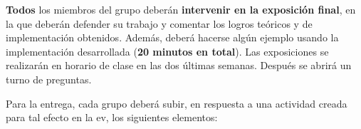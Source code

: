 \documentclass[a4paper]{article}
\begin{document}
\textbf{Todos} los miembros del grupo deberán \textbf{intervenir en la exposición final}, en la que deberán defender su trabajo y comentar los logros teóricos y de implementación obtenidos. Además, deberá hacerse algún ejemplo usando la implementación desarrollada (\textbf{20 minutos en total}). Las exposiciones se realizarán en horario de clase en las dos últimas semanas. Después se abrirá un turno de preguntas.



Para la entrega, cada grupo deberá subir, en respuesta a una actividad creada para tal efecto en la ev, los siguientes elementos:
\end{document}
